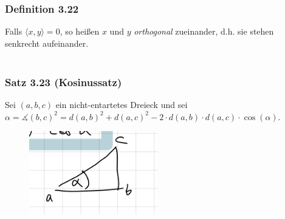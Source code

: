 \documentclass{article}
\begin{document}
\subsubsection*{Definition 3.22}
Falls $\langle x,y \rangle = 0$, so heißen $x$ und $y$ \textit{orthogonal} zueinander, d.h. sie stehen senkrecht aufeinander. \\
\\
\subsubsection*{Satz 3.23 (Kosinussatz)}
Sei $(a,b,c)$ ein nicht-entartetes Dreieck und sei $\alpha = \measuredangle (b,c)^2 = d(a,b)^2 + d(a,c)^2 - 2 \cdot d(a,b) \cdot d(a,c) \cdot \cos(\alpha)$. \\
\begin{figure}[h]
    \centering
    \includegraphics[width=0.5\textwidth]{Images/3.23.jpeg}

\end{figure}  
\\
\end{document}
